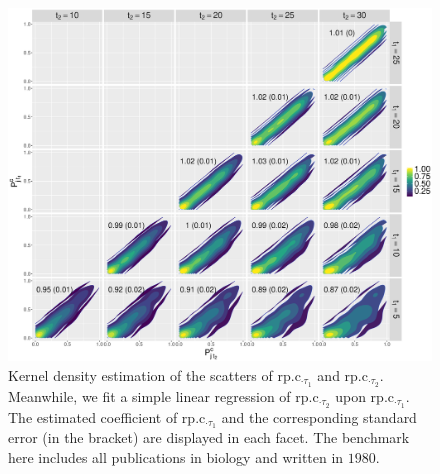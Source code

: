 \begin{figure}[ht!]
    \centering
    \includegraphics[width=\textwidth]{figures/pred_power/pubrp/scatter_bio1980.eps}
    \caption{Kernel density estimation of the scatters of rp.c$_{\cdot \tau_1}$ and rp.c$_{\cdot \tau_2}$. Meanwhile, we fit a simple linear regression of rp.c$_{\cdot \tau_2}$ upon rp.c$_{\cdot \tau_1}$. The estimated coefficient of rp.c$_{\cdot \tau_1}$ and the corresponding standard error (in the bracket) are displayed in each facet. The benchmark here includes all publications in biology and written in $1980$.}
    \label{fig:scatter_pubrp_bio1980}
\end{figure}

